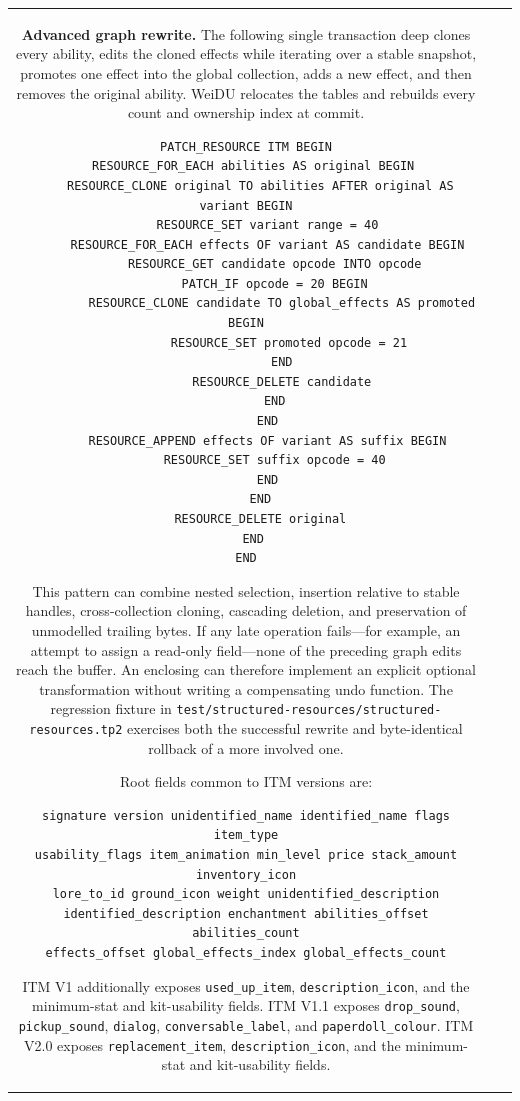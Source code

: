 \documentclass{article}
\def\ttref#1{\ahrefloc{#1}{\tt #1}}
\def\t#1{{\tt #1}}
\begin{document}
\begin{tabular}{cp{10in}|p{10in}}
    \textbf{Advanced graph rewrite.} The following single transaction deep
    clones every ability, edits the cloned effects while iterating over a
    stable snapshot, promotes one effect into the global collection, adds a
    new effect, and then removes the original ability. WeiDU relocates the
    tables and rebuilds every count and ownership index at commit.
\begin{verbatim}
PATCH_RESOURCE ITM BEGIN
  RESOURCE_FOR_EACH abilities AS original BEGIN
    RESOURCE_CLONE original TO abilities AFTER original AS variant BEGIN
      RESOURCE_SET variant range = 40
      RESOURCE_FOR_EACH effects OF variant AS candidate BEGIN
        RESOURCE_GET candidate opcode INTO opcode
        PATCH_IF opcode = 20 BEGIN
          RESOURCE_CLONE candidate TO global_effects AS promoted BEGIN
            RESOURCE_SET promoted opcode = 21
          END
          RESOURCE_DELETE candidate
        END
      END
      RESOURCE_APPEND effects OF variant AS suffix BEGIN
        RESOURCE_SET suffix opcode = 40
      END
    END
    RESOURCE_DELETE original
  END
END
\end{verbatim}

    This pattern can combine nested selection, insertion relative to stable
    handles, cross-collection cloning, cascading deletion, and preservation
    of unmodelled trailing bytes. If any late operation fails---for example,
    an attempt to assign a read-only field---none of the preceding graph edits
    reach the buffer. An enclosing \ttref{PATCH_TRY} can therefore implement
    an explicit optional transformation without writing a compensating undo
    function. The regression fixture in
    \t{test/structured-resources/structured-resources.tp2} exercises both the
    successful rewrite and byte-identical rollback of a more involved one.

    Root fields common to ITM versions are:
\begin{verbatim}
signature version unidentified_name identified_name flags item_type
usability_flags item_animation min_level price stack_amount inventory_icon
lore_to_id ground_icon weight unidentified_description
identified_description enchantment abilities_offset abilities_count
effects_offset global_effects_index global_effects_count
\end{verbatim}
    ITM V1 additionally exposes \t{used_up_item}, \t{description_icon},
    and the minimum-stat and kit-usability fields. ITM V1.1 exposes
    \t{drop_sound}, \t{pickup_sound}, \t{dialog},
    \t{conversable_label}, and \t{paperdoll_colour}. ITM V2.0 exposes
    \t{replacement_item}, \t{description_icon}, and the minimum-stat and
    kit-usability fields.


\end{tabular}
\end{document}
